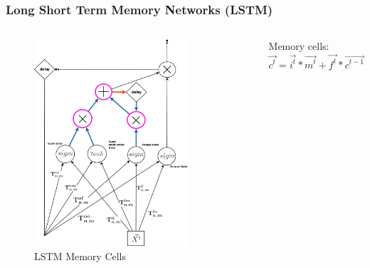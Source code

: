 \documentclass{beamer}
\begin{document}
\begin{frame}
\frametitle{Long Short Term Memory Networks (LSTM)}
\begin{columns}
\begin{figure}[t!]
    \centering
    \includegraphics[width=0.8\textwidth]{./pictures/figures/LSTM_memory_cells.png}
    \caption{LSTM Memory Cells}
    \label{fig:LSTM_memory_cells}
\end{figure}

Memory cells:
$$\vec{c^t} = \vec{i^t} * \vec{m^t} + \vec{f^t} * \vec{c^{t-1}}$$
\end{columns}
\end{frame}
\end{document}

